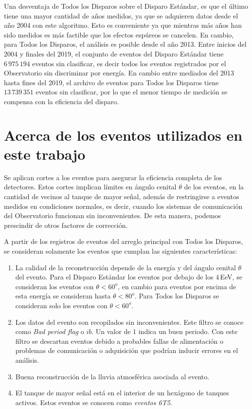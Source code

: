 Una desventaja de Todos los Disparos sobre el Disparo Estándar, es que el último tiene una mayor cantidad de años medidos, ya que se adquieren datos  desde el año 2004 con este algoritmo. Esto es conveniente ya que mientras más años han sido medidos es más factible que los efectos espúreos se cancelen. En cambio, para Todos los Disparos, el análisis  es posible desde el año 2013. Entre inicios del 2004 y finales del 2019, el conjunto de eventos del Disparo Estándar tiene $6\,975\,194$ eventos sin clasificar, es decir todos los eventos registrados por el Observatorio sin discriminar por energía. En cambio entre mediados del 2013 hasta fines del 2019, el archivo de eventos para Todos los Disparos tiene $13\,739\,351$ eventos sin clasificar, por lo que el menor tiempo de medición se compensa con la eficiencia del disparo.


\section{Acerca de los eventos utilizados en este trabajo} \label{filtro}

Se aplican cortes a los eventos para asegurar la eficiencia completa de los detectores. Estos cortes implican límites en ángulo cenital $\theta$ de los eventos, en la cantidad de vecinos al tanque de mayor señal, además de restringirse a eventos medidos en condiciones normales, es decir, cuando los sistemas de comunicación del Observatorio funcionan sin inconvenientes. De esta manera, podemos prescindir de otros factores de corrección.

A partir de los registros de eventos del arreglo principal con Todos los Disparos, se consideran solamente los eventos que cumplan las siguientes características:

    \begin{enumerate}
      \item La calidad de la reconstrucción depende de la energía y del ángulo cenital $\theta$ del evento.  Para el Disparo Estándar los eventos por debajo de los $4\,$EeV, se consideran los eventos con $\theta < 60^o$, en cambio para eventos por encima de esta energía se consideran hasta $\theta < 80^o$. Para Todos los Disparos se consideran solo los eventos con $\theta<60^o$.
      \item Los datos del evento son recopilados sin inconvenientes. Este filtro se conoce como \emph{Bad period flag} o $ib$. Un valor de 1 indica un buen periodo. Con este filtro se descartan eventos debido a probables fallas de alimentación o problemas de comunicación o adquisición que podrían inducir errores en el análisis.
      \item Buena reconstrucción de la lluvia atmosférica asociada al evento.
      \item El tanque de mayor señal está en el interior de un hexágono de tanques activos. Estos eventos se conocen como \textit{eventos 6T5}.
    \end{enumerate}


